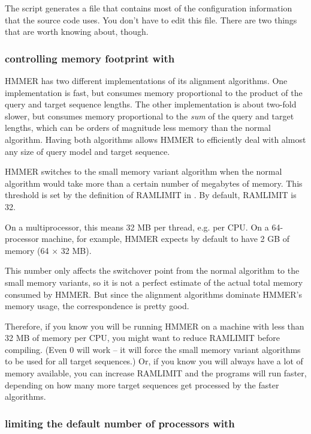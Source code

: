 The  script generates a  file that
contains most of the configuration information that the source code
uses. You don't have to edit this file.  There are two things that are
worth knowing about, though.

\subsubsection{controlling memory footprint with }

HMMER has two different implementations of its alignment algorithms.
One implementation is fast, but consumes memory proportional to the
product of the query and target sequence lengths. The other
implementation is about two-fold slower, but consumes memory
proportional to the \emph{sum} of the query and target lengths, which
can be orders of magnitude less memory than the normal algorithm.
Having both algorithms allows HMMER to efficiently deal with almost
any size of query model and target sequence.

HMMER switches to the small memory variant algorithm when the normal
algorithm would take more than a certain number of megabytes of
memory. This threshold is set by the definition of RAMLIMIT in
. By default, RAMLIMIT is 32. 

On a multiprocessor, this means 32 MB per thread, e.g. per CPU. On a
64-processor machine, for example, HMMER expects by default to have 2
GB of memory (64 $\times$ 32 MB).

This number only affects the switchover point from the normal
algorithm to the small memory variants, so it is not a perfect
estimate of the actual total memory consumed by HMMER. But since the
alignment algorithms dominate HMMER's memory usage, the correspondence
is pretty good.

Therefore, if you know you will be running HMMER on a machine with
less than 32 MB of memory per CPU, you might want to reduce RAMLIMIT
before compiling. (Even 0 will work -- it will force the small memory
variant algorithms to be used for all target sequences.) Or, if you
know you will always have a lot of memory available, you can increase
RAMLIMIT and the programs will run faster, depending on how many more
target sequences get processed by the faster algorithms.

\subsubsection{limiting the default number of processors with }

